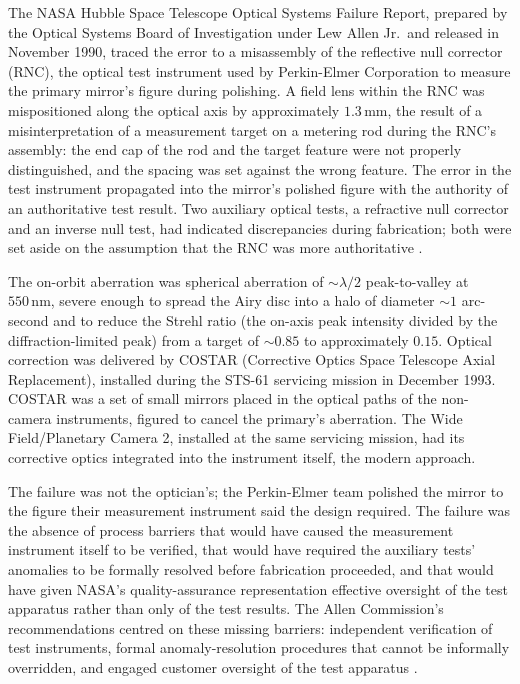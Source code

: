 The NASA Hubble Space Telescope Optical Systems Failure Report,
prepared by the Optical Systems Board of Investigation under Lew
Allen Jr.\ and released in November 1990, traced the error to a
misassembly of the reflective null corrector (RNC), the optical test
instrument used by Perkin-Elmer Corporation to measure the primary
mirror's figure during polishing. A field lens within the RNC was
mispositioned along the optical axis by approximately $1.3\,\si{\milli
\meter}$, the result of a misinterpretation of a measurement target
on a metering rod during the RNC's assembly: the end cap of the rod
and the target feature were not properly distinguished, and the
spacing was set against the wrong feature. The error in the test
instrument propagated into the mirror's polished figure with the
authority of an authoritative test result. Two auxiliary optical
tests, a refractive null corrector and an inverse null test, had
indicated discrepancies during fabrication; both were set aside on
the assumption that the RNC was more authoritative
\cite{acc:nasa-hubble-optical-systems-1990}.

The on-orbit aberration was spherical aberration of $\sim \lambda/2$
peak-to-valley at $550\,\si{\nano\meter}$, severe enough to spread
the Airy disc into a halo of diameter $\sim 1$ arc-second and to
reduce the Strehl ratio (the on-axis peak intensity divided by the
diffraction-limited peak) from a target of $\sim 0.85$ to
approximately $0.15$. Optical correction was delivered by COSTAR
(Corrective Optics Space Telescope Axial Replacement), installed
during the STS-61 servicing mission in December 1993. COSTAR was a
set of small mirrors placed in the optical paths of the
non-camera instruments, figured to cancel the primary's
aberration. The Wide Field/Planetary Camera 2, installed at the same
servicing mission, had its corrective optics integrated into the
instrument itself, the modern approach.

The failure was not the optician's; the Perkin-Elmer team polished
the mirror to the figure their measurement instrument said the
design required. The failure was the absence of process barriers
that would have caused the measurement instrument itself to be
verified, that would have required the auxiliary tests' anomalies to
be formally resolved before fabrication proceeded, and that would
have given NASA's quality-assurance representation effective
oversight of the test apparatus rather than only of the test results.
The Allen Commission's recommendations centred on these missing
barriers: independent verification of test instruments, formal
anomaly-resolution procedures that cannot be informally overridden,
and engaged customer oversight of the test apparatus
\cite{acc:nasa-hubble-optical-systems-1990}.

